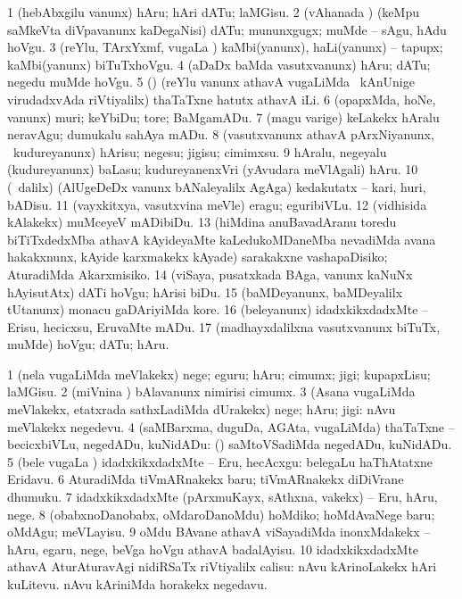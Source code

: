 \bentry
{}
\gl{\sakirx}
\bmng
\bnum
\num{1} (hebAbxgilu \mo vanunx) hAru; hAri dATu; laMGisu. 
\num{2} (vAhanada \vi) (keMpu saMkeVta diVpavanunx kaDegaNisi) dATu; mununxgugx; muMde -- sAgu, hAdu hoVgu. 
\num{3} (reYlu, TArxYxmf, \mo vugaLa \vi) kaMbi(yanunx), haLi(yanunx) -- tapupx; kaMbi(yanunx) biTuTxhoVgu. 
\num{4} (aDaDx baMda vasutxvanunx) hAru; dATu; negedu muMde hoVgu. 
\num{5} (\ame) (reYlu \mo vanunx athavA \mo vugaLiMda \kanmu\ kAnUnige virudadxvAda riVtiyalilx) thaTaTxne hatutx athavA iLi. 
\num{6} (opapxMda, hoNe, \mo vanunx) muri; keYbiDu; tore; BaMgamADu. 
\num{7} (magu \mo varige) keLakekx hAralu neravAgu; dumukalu sahAya mADu. 
\num{8} (vasutxvanunx athavA pArxNiyanunx, \kanmu\ kudureyanunx) hArisu; negesu; jigisu; cimimxsu. 
\num{9} hAralu, negeyalu (kudureyanunx) baLasu; kudureyanenxVri (yAvudara meVlAgali) hAru. 
\num{10} (\sA\ \BUkaq dalilx) (AlUgeDeDx \mo vanunx bANaleyalilx AgAga) kedakutatx -- kari, huri, bADisu. 
\num{11} (vayxkitxya, vasutxvina meVle) eragu; eguribiVLu. 
\num{12} (vidhisida kAlakekx) muMceyeV mADibiDu. 
\num{13} (hiMdina anuBavadAranu toredu biTiTxdedxMba athavA kAyideyaMte kaLedukoMDaneMba nevadiMda avana hakakxnunx, kAyide karxmakekx kAyade) sarakakxne vashapaDisiko; AturadiMda Akarxmisiko. 
\num{14} (viSaya, pusatxkada BAga, \mo vanunx kaNuNx hAyisutAtx) dATi hoVgu; hArisi biDu. 
\num{15} (baMDeyanunx, baMDeyalilx tUtanunx) monacu gaDAriyiMda kore. 
\num{16} (beleyanunx) idadxkikxdadxMte -- Erisu, hecicxsu, EruvaMte mADu. 
\num{17} (madhayxdalilxna vasutxvanunx biTuTx, muMde) hoVgu; dATu; hAru. 
\enum
\emng

\noindent
\gl{\akirx}
\bmng
\bnum
\num{1} (nela \mo vugaLiMda meVlakekx) nege; eguru; hAru; cimumx; jigi; kupapxLisu; laMGisu. 
\num{2} (miVnina \vi) bAlavanunx nimirisi cimumx. 
\num{3} (Asana \mo vugaLiMda meVlakekx, etatxrada sathxLadiMda dUrakekx) nege; hAru; jigi:  nAvu meVlakekx negedevu. 
\num{4} (saMBarxma, duguDa, AGAta, \mo vugaLiMda) thaTaTxne -- becicxbiVLu, negedADu, kuNidADu: (\kanmu)  saMtoVSadiMda negedADu, kuNidADu. 
\num{5} (bele \mo vugaLa \vi) idadxkikxdadxMte -- Eru, hecAcxgu:  belegaLu haThAtatxne Eridavu. 
\num{6} AturadiMda tiVmARnakekx baru; tiVmARnakekx diDiVrane dhumuku. 
\num{7} idadxkikxdadxMte (pArxmuKayx, sAthxna, \mo vakekx) -- Eru, hAru, nege. 
\num{8} (obabxnoDanobabx, oMdaroDanoMdu) hoMdiko; hoMdAvaNege baru; oMdAgu; meVLayisu. 
\num{9} oMdu BAvane athavA viSayadiMda inonxMdakekx -- hAru, egaru, nege, beVga hoVgu athavA badalAyisu. 
\num{10} idadxkikxdadxMte athavA AturAturavAgi nidiRSaTx riVtiyalilx calisu:  nAvu kArinoLakekx hAri kuLitevu.   nAvu kAriniMda horakekx negedavu. 
\enum
\emng

